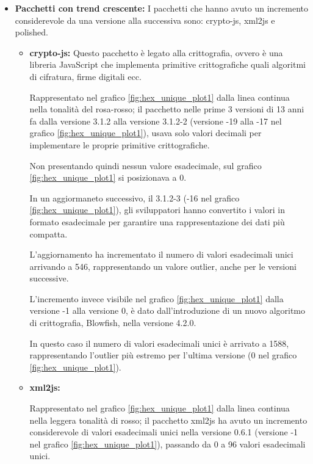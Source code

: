 \begin{itemize}
    \item \textbf{Pacchetti con trend crescente:}
I pacchetti che hanno avuto un incremento considerevole da una versione alla successiva sono: crypto-js, xml2js e polished.

    \begin{itemize}
        \item \textbf{crypto-js:} 
Questo pacchetto è legato alla crittografia, ovvero è una libreria JavaScript 
che implementa primitive crittografiche quali algoritmi di cifratura, %
firme digitali ecc. %

Rappresentato nel grafico \ref{fig:hex_unique_plot1} dalla linea continua nella tonalità del rosa-rosso;
il pacchetto nelle prime 3 versioni di 13 anni fa dalla versione 3.1.2 alla versione 3.1.2-2
(versione -19 alla -17 nel grafico \ref{fig:hex_unique_plot1}), 
usava solo valori decimali per implementare le proprie primitive crittografiche.

Non presentando quindi nessun valore esadecimale, sul grafico \ref{fig:hex_unique_plot1} 
si posizionava a 0.

In un aggiormaneto successivo, il 3.1.2-3 (-16 nel grafico \ref{fig:hex_unique_plot1}), 
gli sviluppatori hanno convertito i valori 
in formato esadecimale per garantire una rappresentazione dei dati più compatta. %

L'aggiornamento ha incrementato il numero di valori esadecimali unici arrivando a 546,
rappresentando un valore outlier, anche per le versioni successive.

L'incremento invece visibile nel grafico \ref{fig:hex_unique_plot1} dalla versione -1 alla versione 0, 
è dato dall'introduzione di un nuovo algoritmo di crittografia, Blowfish, nella versione 4.2.0.

In questo caso il numero di valori esadecimali unici è arrivato a 1588, 
rappresentando l'outlier più estremo per l'ultima versione (0 nel grafico \ref{fig:hex_unique_plot1}).

        \item \textbf{xml2js:}

Rappresentato nel grafico \ref{fig:hex_unique_plot1} dalla linea continua nella leggera tonalità di rosso;
il pacchetto xml2js ha avuto un incremento considerevole di valori 
esadecimali unici nella versione 0.6.1 (versione -1 nel grafico \ref{fig:hex_unique_plot1}),
passando da 0 a 96 valori esadecimali unici.


\end{itemize}
\end{itemize}
